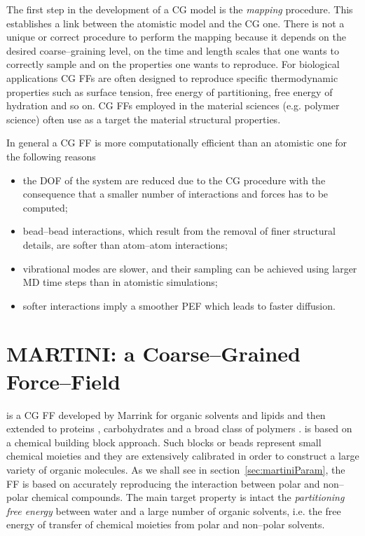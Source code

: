 The first step in the development of a \ac{CG} model is the \textit{mapping} procedure. This establishes a link
between the atomistic model and the \ac{CG} one. There is not a unique or correct procedure to perform the
mapping because it depends on the desired coarse--graining level, on the time and length scales that one wants to
correctly sample and on the properties one wants to reproduce. For biological applications \ac{CG} \acp{FF} are
often designed to reproduce specific thermodynamic properties such as surface tension, free energy of
partitioning, free energy of hydration and so on. \ac{CG} \acp{FF} employed in the material sciences (e.g.
polymer science) often use as a target the material structural properties.

In general a \ac{CG} \ac{FF} is more computationally efficient than an atomistic one for the following reasons
\begin{itemize}
	\item the \ac{DOF} of the system are reduced due to the \ac{CG} procedure with the consequence that a smaller number of interactions and forces has to be computed;%
	\item bead--bead interactions, which result from the removal of finer structural details, are softer than atom--atom interactions;%
	\item vibrational modes are slower, and their sampling can be achieved using larger \ac{MD} time steps than in atomistic simulations;%
	\item softer interactions imply a smoother \ac{PEF} which leads to faster diffusion.
\end{itemize}

\section{MARTINI: a Coarse--Grained Force--Field}
\label{sec:martini}
\martini{} is a \ac{CG} \ac{FF} developed by Marrink \etal{} \cite{Martini} for organic solvents and lipids and
then extended to proteins \cite{MartiniProtein}, carbohydrates \cite{MartiniCarbo} and a broad class of polymers
\cite{MartiniPolymers}. \martini{} is based on a chemical building block approach. Such \martini{} blocks or beads
represent small chemical moieties and they are extensively calibrated in order to construct a large variety of
organic molecules. As we shall see in section~\ref{sec:martiniParam}, the \ac{FF} is based on accurately
reproducing the interaction between polar and non--polar chemical compounds. The main target property is intact
the \textit{partitioning free energy} between water and a large number of organic solvents, i.e. the free energy
of transfer of chemical moieties from polar and non--polar solvents.

